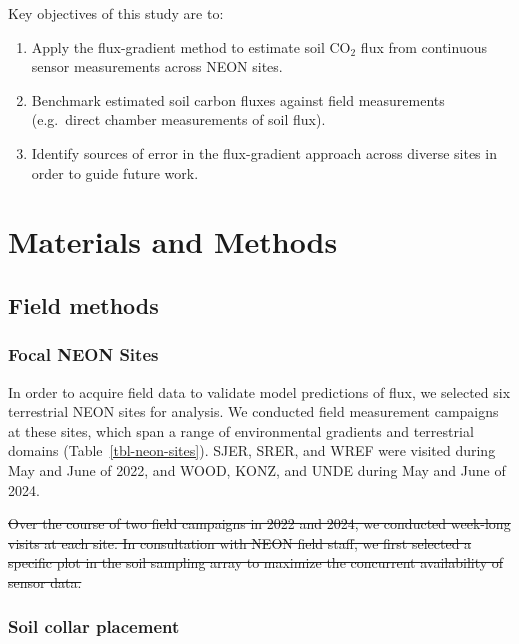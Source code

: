 \documentclass[
  letterpaper,
  DIV=11,
  numbers=noendperiod]{scrartcl}
\providecommand{\tightlist}{%
  \setlength{\itemsep}{0pt}\setlength{\parskip}{0pt}}\usepackage{longtable,booktabs,array}
\providecommand{\DIFadd}[1]{{\protect\color{blue}\uwave{#1}}} %
\providecommand{\DIFdel}[1]{{\protect\color{red}\sout{#1}}}                      %
\providecommand{\DIFaddbegin}{} %
\providecommand{\DIFaddend}{} %
\providecommand{\DIFdelbegin}{} %
\providecommand{\DIFdelend}{} %
\newcommand{\DIFscaledelfig}{0.5}
\newlength{\DIFdelgraphicswidth} %
\newlength{\DIFdelgraphicsheight} %
\newcommand{\DIFaddincludegraphics}[2][]{{\color{blue}\fbox{\DIFOincludegraphics[#1]{#2}}}} %
\newcommand{\DIFdelincludegraphics}[2][]{%
\sbox{\DIFdelgraphicsbox}{\DIFOincludegraphics[#1]{#2}}%
\settoboxwidth{\DIFdelgraphicswidth}{\DIFdelgraphicsbox} %
\settoboxtotalheight{\DIFdelgraphicsheight}{\DIFdelgraphicsbox} %
\scalebox{\DIFscaledelfig}{%
\parbox[b]{\DIFdelgraphicswidth}{\usebox{\DIFdelgraphicsbox}\\[-\baselineskip] \rule{\DIFdelgraphicswidth}{0em}}\llap{\resizebox{\DIFdelgraphicswidth}{\DIFdelgraphicsheight}{%
\setlength{\unitlength}{\DIFdelgraphicswidth}%
\begin{picture}(1,1)%
\thicklines\linethickness{2pt} %
{\color[rgb]{1,0,0}\put(0,0){\framebox(1,1){}}}%
{\color[rgb]{1,0,0}\put(0,0){\line( 1,1){1}}}%
{\color[rgb]{1,0,0}\put(0,1){\line(1,-1){1}}}%
\end{picture}%
}\hspace*{3pt}}} %
} %
\DeclareRobustCommand{\DIFaddbegin}{\DIFOaddbegin \let\includegraphics\DIFaddincludegraphics} %
\DeclareRobustCommand{\DIFaddend}{\DIFOaddend \let\includegraphics\DIFOincludegraphics} %
\DeclareRobustCommand{\DIFdelbegin}{\DIFOdelbegin \let\includegraphics\DIFdelincludegraphics} %
\DeclareRobustCommand{\DIFdelend}{\DIFOaddend \let\includegraphics\DIFOincludegraphics} %
\begin{document}
Key objectives of this study are to:

\begin{enumerate}
\def\labelenumi{\arabic{enumi}.}
\tightlist
\item
  Apply the flux-gradient method to estimate soil CO\(_{2}\) flux from
  continuous sensor measurements across \DIFaddbegin \DIFadd{six }\DIFaddend NEON sites.
\item
  Benchmark estimated soil carbon fluxes against field measurements
  (e.g.~direct chamber measurements of soil flux).
\item
  Identify sources of error in the flux-gradient approach across diverse
  sites in order to guide future work.
\end{enumerate}

\section{Materials and Methods}\label{materials-and-methods}

\subsection{Field methods}\label{field-methods}

\subsubsection{Focal NEON Sites}\label{focal-neon-sites}

In order to acquire field data to validate model predictions of flux, we
selected six terrestrial NEON sites for analysis. We conducted \DIFaddbegin \DIFadd{roughly
week-long }\DIFaddend field measurement campaigns at these sites, which span a range
of environmental gradients and terrestrial domains
(Table~\ref{tbl-neon-sites}). SJER, SRER, and WREF were visited during
May and June of 2022, and WOOD, KONZ, and UNDE during May and June of
2024.

\DIFdelbegin \DIFdel{Over the course of two field campaigns in 2022 and 2024, we conducted
week-long visits at each site. In consultation with NEON field staff, we
first selected a specific plot in the soil sampling array to maximize
the concurrent availability of sensor data.
}%

\DIFdelend \subsubsection{Soil collar placement}\label{soil-collar-placement}
\end{document}
